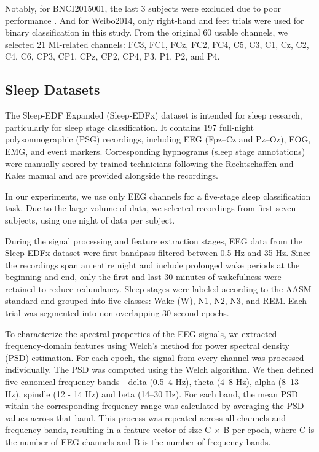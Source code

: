 \documentclass[journal,twocolumn]{IEEEtran}
\begin{document}
Notably, for BNCI2015001, the last 3 subjects were excluded due to poor performance \cite{faller2012autocalibration}. And for Weibo2014, only right-hand and feet trials were used for binary classification in this study. From the original 60 usable channels, we selected 21 MI-related channels: FC3, FC1, FCz, FC2, FC4, C5, C3, C1, Cz, C2, C4, C6, CP3, CP1, CPz, CP2, CP4, P3, P1, P2, and P4.


\subsection{Sleep Datasets}
The Sleep-EDF Expanded (Sleep-EDFx) dataset is intended for sleep research, particularly for sleep stage classification. It contains 197 full-night polysomnographic (PSG) recordings, including EEG (Fpz–Cz and Pz–Oz), EOG, EMG, and event markers. Corresponding hypnograms (sleep stage annotations) were manually scored by trained technicians following the Rechtschaffen and Kales manual and are provided alongside the recordings.

In our experiments, we use only EEG channels for a five-stage sleep classification task. Due to the large volume of data, we selected recordings from first seven subjects, using one night of data per subject.

During the signal processing and feature extraction stages, EEG data from the Sleep-EDFx dataset were first bandpass filtered between 0.5 Hz and 35 Hz. Since the recordings span an entire night and include prolonged wake periods at the beginning and end, only the first and last 30 minutes of wakefulness were retained to reduce redundancy. Sleep stages were labeled according to the AASM standard and grouped into five classes: Wake (W), N1, N2, N3, and REM. Each trial was segmented into non-overlapping 30-second epochs.

To characterize the spectral properties of the EEG signals, we extracted frequency-domain features using Welch’s method for power spectral density (PSD) estimation. For each epoch, the signal from every channel was processed individually. The PSD was computed using the Welch algorithm. We then defined five canonical frequency bands—delta (0.5–4 Hz), theta (4–8 Hz), alpha (8–13 Hz), spindle (12 - 14 Hz) and beta (14–30 Hz). For each band, the mean PSD within the corresponding frequency range was calculated by averaging the PSD values across that band. This process was repeated across all channels and frequency bands, resulting in a feature vector of size C $\times$ B per epoch, where C is the number of EEG channels and B is the number of frequency bands.
\end{document}
